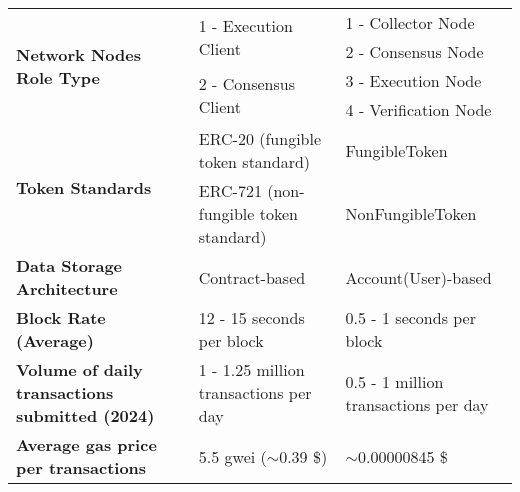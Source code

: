 \documentclass[10pt]{article}
\begin{document}
\begin{table*}[htbp]
\begin{adjustwidth}{-1.5cm}{}
\begin{tabular}{@{} m{4cm} ll@{}}
            \multirow{4}{*}{\textbf{Network Nodes Role Type}}       & \multicolumn{1}{l}{\multirow{2}{*}{1 - Execution Client}}           & 1 - Collector Node                   \\ \cmidrule(l){3-3}
                                                                    & \multicolumn{1}{l}{}                                                & 2 - Consensus Node                   \\ \cmidrule(l){2-3}
                                                                    & \multicolumn{1}{l}{\multirow{2}{*}{2 - Consensus Client}}           & 3 - Execution Node                   \\ \cmidrule(l){3-3}
                                                                    & \multicolumn{1}{l}{}                                                & 4 - Verification Node                \\ \midrule
            \multirow{2}{*}{\textbf{Token Standards}}               & \multicolumn{1}{l}{ERC-20 (fungible token standard)}                & FungibleToken                        \\ \cmidrule(l){2-3}
                                                                    & \multicolumn{1}{l}{ERC-721 (non-fungible token standard)}           & NonFungibleToken                     \\ \midrule
            \textbf{Data Storage Architecture}                      & \multicolumn{1}{l}{Contract-based}                                  & Account(User)-based                  \\ \midrule
            \textbf{Block Rate (Average)}                           & \multicolumn{1}{l}{12 - 15 seconds per block}                       & 0.5 - 1 seconds per block            \\ \midrule
            \textbf{Volume of daily transactions submitted (2024)}  & \multicolumn{1}{l}{1 - 1.25 million transactions per day}           & 0.5 - 1 million transactions per day \\ \midrule
            \textbf{Average gas price per transactions}             & \multicolumn{1}{l}{5.5 gwei ($\sim$0.39 \$)}                        & $\sim$0.00000845 \$                  \\ \bottomrule
        \end{tabular}
    \end{adjustwidth}
    \label{tab:my-table}
\end{table*}
\end{document}
